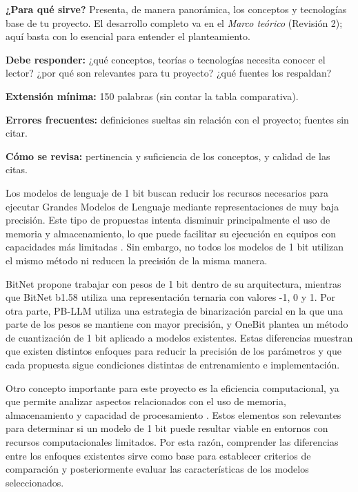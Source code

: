 \begin{guia}
\textbf{¿Para qué sirve?} Presenta, de manera panorámica, los conceptos y tecnologías base de tu proyecto. El desarrollo
completo va en el \emph{Marco teórico} (Revisión 2); aquí basta con lo esencial para entender el planteamiento.

\textbf{Debe responder:} ¿qué conceptos, teorías o tecnologías necesita conocer el lector? ¿por qué son relevantes para
tu proyecto? ¿qué fuentes los respaldan?

\textbf{Extensión mínima:} 150 palabras (sin contar la tabla comparativa).

\textbf{Errores frecuentes:} definiciones sueltas sin relación con el proyecto; fuentes sin citar.

\textbf{Cómo se revisa:} pertinencia y suficiencia de los conceptos, y calidad de las citas.
\end{guia}


Los modelos de lenguaje de 1 bit buscan reducir los recursos necesarios para ejecutar Grandes Modelos de Lenguaje mediante representaciones de muy baja precisión. Este tipo de propuestas intenta disminuir principalmente el uso de memoria y almacenamiento, lo que puede facilitar su ejecución en equipos con capacidades más limitadas \cite{bitnet2023,bitnet1582024}. Sin embargo, no todos los modelos de 1 bit utilizan el mismo método ni reducen la precisión de la misma manera.

BitNet \cite{bitnet2023} propone trabajar con pesos de 1 bit dentro de su arquitectura, mientras que BitNet b1.58 \cite{bitnet1582024} utiliza una representación ternaria con valores -1, 0 y 1. Por otra parte, PB-LLM \cite{pbllm2024} utiliza una estrategia de binarización parcial en la que una parte de los pesos se mantiene con mayor precisión, y OneBit \cite{onebit2024} plantea un método de cuantización de 1 bit aplicado a modelos existentes. Estas diferencias muestran que existen distintos enfoques para reducir la precisión de los parámetros y que cada propuesta sigue condiciones distintas de entrenamiento e implementación.

Otro concepto importante para este proyecto es la eficiencia computacional, ya que permite analizar aspectos relacionados con el uso de memoria, almacenamiento y capacidad de procesamiento \cite{bitnet2023,bitnet1582024}. Estos elementos son relevantes para determinar si un modelo de 1 bit puede resultar viable en entornos con recursos computacionales limitados. Por esta razón, comprender las diferencias entre los enfoques existentes sirve como base para establecer criterios de comparación y posteriormente evaluar las características de los modelos seleccionados.

